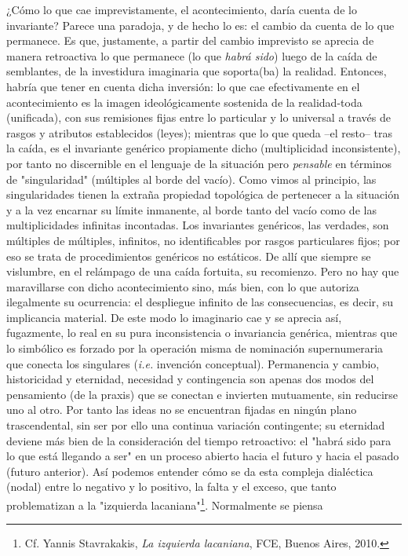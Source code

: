 \documentclass{book}
\begin{document}
¿Cómo lo que cae imprevistamente, el acontecimiento, daría cuenta de lo
invariante? Parece una paradoja, y de hecho lo es: el cambio da cuenta
de lo que permanece. Es que, justamente, a partir del cambio imprevisto
se aprecia de manera retroactiva lo que permanece (lo que \emph{habrá
sido}) luego de la caída de semblantes, de la investidura imaginaria que
soporta(ba) la realidad. Entonces, habría que tener en cuenta dicha
inversión: lo que cae efectivamente en el acontecimiento es la imagen
ideológicamente sostenida de la realidad-toda (unificada), con sus
remisiones fijas entre lo particular y lo universal a través de rasgos y
atributos establecidos (leyes); mientras que lo que queda --el resto--
tras la caída, es el invariante genérico propiamente dicho
(multiplicidad inconsistente), por tanto no discernible en el lenguaje
de la situación pero \emph{pensable} en términos de "singularidad"
(múltiples al borde del vacío). Como vimos al principio, las
singularidades tienen la extraña propiedad topológica de pertenecer a la
situación y a la vez encarnar su límite inmanente, al borde tanto del
vacío como de las multiplicidades infinitas incontadas. Los invariantes
genéricos, las verdades, son múltiples de múltiples, infinitos, no
identificables por rasgos particulares fijos; por eso se trata de
procedimientos genéricos no estáticos. De allí que siempre se vislumbre,
en el relámpago de una caída fortuita, su recomienzo. Pero no hay que
maravillarse con dicho acontecimiento sino, más bien, con lo que
autoriza ilegalmente su ocurrencia: el despliegue infinito de las
consecuencias, es decir, su implicancia material. De este modo lo
imaginario cae y se aprecia así, fugazmente, lo real en su pura
inconsistencia o invariancia genérica, mientras que lo simbólico es
forzado por la operación misma de nominación supernumeraria que conecta
los singulares (\emph{i.e.} invención conceptual). Permanencia y cambio,
historicidad y eternidad, necesidad y contingencia son apenas dos modos
del pensamiento (de la praxis) que se conectan e invierten mutuamente,
sin reducirse uno al otro. Por tanto las ideas no se encuentran fijadas
en ningún plano trascendental, sin ser por ello una continua variación
contingente; su eternidad deviene más bien de la consideración del
tiempo retroactivo: el "habrá sido para lo que está llegando a ser" en
un proceso abierto hacia el futuro y hacia el pasado (futuro anterior).
Así podemos entender cómo se da esta compleja dialéctica (nodal) entre
lo negativo y lo positivo, la falta y el exceso, que tanto problematizan
a la "izquierda lacaniana"\footnote{Cf. Yannis Stavrakakis, \emph{La
  izquierda lacaniana}, FCE, Buenos Aires, 2010.}. Normalmente se piensa
\end{document}
